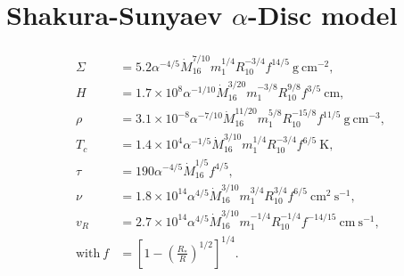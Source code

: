 \section[Shakura-Sunyaev $\alpha$-Disc model]{Shakura-Sunyaev $\alpha$-Disc model}
\begin{align}
\begin{split}
\Sigma 	&= 5.2 \alpha^{-4/5} \dot{M}^{7/10}_{16} m^{1/4}_1 R^{-3/4}_{10} f^{14/5}\ \mathrm{g\ cm^{-2}}, \\
H		&= 1.7 \times 10^8 \alpha^{-1/10} \dot{M}^{3/20}_{16} m^{-3/8}_1 R^{9/8}_{10} f^{3/5}\ \mathrm{cm}, \\
\rho		&= 3.1 \times 10^{-8} \alpha^{-7/10} \dot{M}^{11/20}_{16} m^{5/8}_1 R^{-15/8}_{10} f^{11/5}\ \mathrm{g\ cm^{-3}}, \\
T_c		&= 1.4 \times 10^4 \alpha^{-1/5} \dot{M}^{3/10}_{16} m^{1/4}_1 R^{-3/4}_{10} f^{6/5}\ \mathrm{K}, \\
\tau		&= 190 \alpha^{-4/5} \dot{M}^{1/5}_{16} f^{4/5}, \\
\nu		&= 1.8 \times 10^{14} \alpha^{4/5} \dot{M}^{3/10}_{16} m^{3/4}_1 R^{3/4}_{10} f^{6/5}\ \mathrm{cm^2\ s^{-1}},  \\
v_R		&= 2.7 \times 10^{14} \alpha^{4/5} \dot{M}^{3/10}_{16} m^{-1/4}_1 R^{-1/4}_{10} f^{-14/15}\ \mathrm{cm\ s^{-1}},  \\
\mathrm{with}\ f		&= \left[ 1 - \left( \frac{R_*}{R} \right)^{1/2} \right]^{1/4}. \\
\end{split}
\label{eq:alpha_model}
\end{align}
